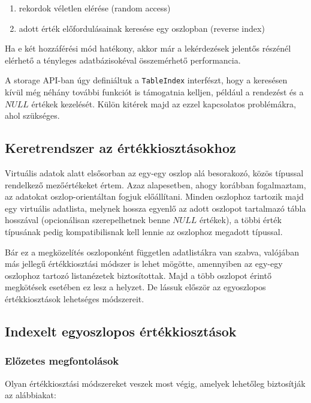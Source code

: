 \documentclass[
    parspace,
    noindent,
    nohyp,
]{elteiktdk}[2023/04/10]
\begin{document}
\begin{enumerate}
  \item rekordok véletlen elérése (random access)
  \item adott érték előfordulásainak keresése egy oszlopban (reverse index)
\end{enumerate}

Ha e két hozzáférési mód hatékony, akkor már a lekérdezések jelentős részénél
elérhető a tényleges adatbázisokéval összemérhető performancia.

A storage API-ban úgy definiáltuk a \texttt{TableIndex} interfészt,
hogy a keresésen kívül még néhány további funkciót is támogatnia kelljen,
például a rendezést és a $NULL$ értékek kezelését.
Külön kitérek majd az ezzel kapcsolatos problémákra, ahol szükséges.

\subsection{Keretrendszer az értékkiosztásokhoz}

Virtuális adatok alatt elsősorban az egy-egy oszlop alá besorakozó,
közös típussal rendelkező mezőértékeket értem.
Azaz alapesetben, ahogy korábban fogalmaztam, az adatokat oszlop-orientáltan fogjuk előállítani.
Minden oszlophoz tartozik majd egy virtuális adatlista,
melynek hossza egyenlő az adott oszlopot tartalmazó tábla hosszával
(opcionálisan szerepelhetnek benne $NULL$ értékek),
a többi érték típusának pedig kompatibilisnak kell lennie az oszlophoz megadott típussal.

Bár ez a megközelítés oszloponként független adatlistákra van szabva,
valójában más jellegű értékkiosztási módszer is lehet mögötte,
amennyiben az egy-egy oszlophoz tartozó listanézetek biztosítottak.
Majd a több oszlopot érintő megkötések esetében ez lesz a helyzet.
De lássuk először az egyoszlopos értékkiosztások lehetséges módszereit.

\subsection{Indexelt egyoszlopos értékkiosztások}

\subsubsection{Előzetes megfontolások}

Olyan értékkiosztási módszereket veszek most végig,
amelyek lehetőleg biztosítják az alábbiakat:
\end{document}
